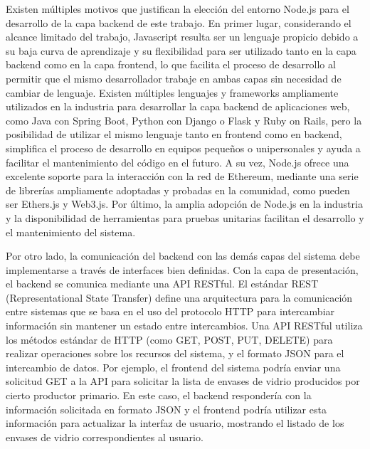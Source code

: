 Existen múltiples motivos que justifican la elección del entorno Node.js para el desarrollo de la capa backend de este trabajo. En primer lugar, considerando el alcance limitado del trabajo, Javascript resulta ser un lenguaje propicio debido a su baja curva de aprendizaje y su flexibilidad para ser utilizado tanto en la capa backend como en la capa frontend, lo que facilita el proceso de desarrollo al permitir que el mismo desarrollador trabaje en ambas capas sin necesidad de cambiar de lenguaje. Existen múltiples lenguajes y frameworks ampliamente utilizados en la industria para desarrollar la capa backend de aplicaciones web, como Java con Spring Boot, Python con Django o Flask y Ruby on Rails, pero la posibilidad de utilizar el mismo lenguaje tanto en frontend como en backend, simplifica el proceso de desarrollo en equipos pequeños o unipersonales y ayuda a facilitar el mantenimiento del código en el futuro. A su vez, Node.js ofrece una excelente soporte para la interacción con la red de Ethereum, mediante una serie de librerías ampliamente adoptadas y probadas en la comunidad, como pueden ser Ethers.js y Web3.js. Por último, la amplia adopción de Node.js en la industria y la disponibilidad de herramientas para pruebas unitarias facilitan el desarrollo y el mantenimiento del sistema. 

Por otro lado, la comunicación del backend con las demás capas del sistema debe implementarse a través de interfaces bien definidas. Con la capa de presentación, el backend se comunica mediante una API RESTful. El estándar REST (Representational State Transfer) define una arquitectura para la comunicación entre sistemas que se basa en el uso del protocolo HTTP para intercambiar información sin mantener un estado entre intercambios. Una API RESTful utiliza los métodos estándar de HTTP (como GET, POST, PUT, DELETE) para realizar operaciones sobre los recursos del sistema, y el formato JSON para el intercambio de datos. Por ejemplo, el frontend del sistema podría enviar una solicitud GET a la API para solicitar la lista de envases de vidrio producidos por cierto productor primario. En este caso, el backend respondería con la información solicitada en formato JSON y el frontend podría utilizar esta información para actualizar la interfaz de usuario, mostrando el listado de los envases de vidrio correspondientes al usuario.


